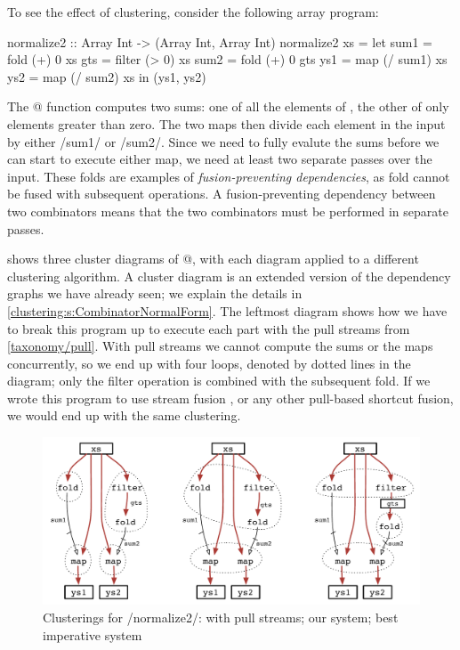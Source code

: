 To see the effect of clustering, consider the following array program:

\begin{haskell}
normalize2 :: Array Int -> (Array Int, Array Int)
normalize2 xs
 = let sum1 = fold   (+)  0   xs
       gts  = filter (>   0)  xs
       sum2 = fold   (+)  0   gts
       ys1  = map    (/ sum1) xs
       ys2  = map    (/ sum2) xs
   in (ys1, ys2)
\end{haskell}

The @ function computes two sums: one of all the elements of \Hs@xs@, the other of only elements greater than zero.
The two maps then divide each element in the input \Hs@xs@ by either \Hs/sum1/ or \Hs/sum2/.
Since we need to fully evalute the sums before we can start to execute either map, we need at least two separate passes over the input.
These folds are examples of \emph{fusion-preventing dependencies}, as fold cannot be fused with subsequent operations.
A fusion-preventing dependency between two combinators means that the two combinators must be performed in separate passes.

 shows three cluster diagrams of @, with each diagram applied to a different clustering algorithm.
A cluster diagram is an extended version of the dependency graphs we have already seen; we explain the details in \cref{clustering:s:CombinatorNormalForm}.
The leftmost diagram shows how we have to break this program up to execute each part with the pull streams from \cref{taxonomy/pull}.
With pull streams we cannot compute the sums or the maps concurrently, so we end up with four loops, denoted by dotted lines in the diagram; only the filter operation is combined with the subsequent fold.
If we wrote this program to use stream fusion \citep{coutts2007stream}, or any other pull-based shortcut fusion, we would end up with the same clustering.

\begin{figure}
\begin{center}
\includegraphics[scale=0.5]{copy/03-body/clustering/figures/ex1-compare.pdf}
\end{center}
\caption{Clusterings for \Hs/normalize2/: with pull streams; our system; best imperative system}
\label{clustering:f:normalize2-clusterings}
\end{figure}


